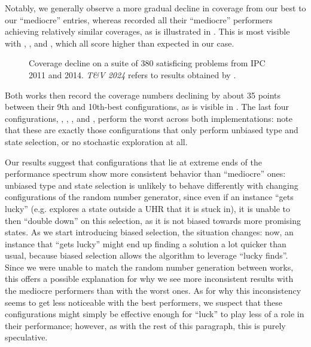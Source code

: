 Notably, we generally observe a more gradual decline in coverage from our best to our ``mediocre'' entries, whereas  recorded all their ``mediocre'' performers achieving relatively similar coverages, as is illustrated in . This is most visible with \hiHu, \hiHh, and \lwHh, which all score higher than expected in our case.

\begin{figure}[{{TBLPOS}}]
    \centering
    
    \caption{Coverage decline on a suite of 380 satisficing problems from IPC 2011 and 2014. \textit{T\&V 2024} refers to results obtained by .}
    \label{fig:repltrend}
\end{figure}

Both works then record the coverage numbers declining by about 35 points between their 9th and 10th-best configurations, as is visible in . The last four configurations, \lwUu, \hiUu, \hgUu, and \gbfs, perform the worst across both implementations: note that these are exactly those configurations that only perform unbiased type and state selection, or no stochastic exploration at all.

Our results suggest that configurations that lie at extreme ends of the performance spectrum show more consistent behavior than ``mediocre'' ones: unbiased type and state selection is unlikely to behave differently with changing configurations of the random number generator, since even if an instance ``gets lucky'' (e.g. explores a state outside a UHR that it is stuck in), it is unable to then ``double down'' on this selection, as it is not biased towards more promising states. As we start introducing biased selection, the situation changes: now, an instance that ``gets lucky'' might end up finding a solution a lot quicker than usual, because biased selection allows the algorithm to leverage ``lucky finds''. Since we were unable to match the random number generation between works, this offers a possible explanation for why we see more inconsistent results with the mediocre performers than with the worst ones. As for why this inconsistency seems to get less noticeable with the best performers, we suspect that these configurations might simply be effective enough for ``luck'' to play less of a role in their performance; however, as with the rest of this paragraph, this is purely speculative.

